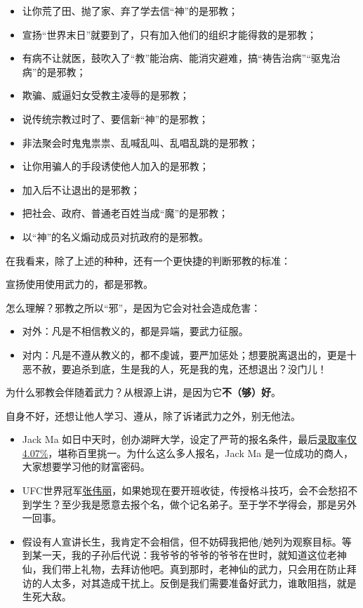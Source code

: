 \begin{itemize}[nosep, left=\parindent]
    \item 让你荒了田、抛了家、弃了学去信“神”的是邪教；
    \item 宣扬“世界末日”就要到了，只有加入他们的组织才能得救的是邪教；
    \item 有病不让就医，鼓吹入了“教”能治病、能消灾避难，搞“祷告治病”“驱鬼治病”的是邪教；
    \item 欺骗、威逼妇女受教主凌辱的是邪教；
    \item 说传统宗教过时了、要信新“神”的是邪教；
    \item 非法聚会时鬼鬼祟祟、乱喊乱叫、乱唱乱跳的是邪教；
    \item 让你用骗人的手段诱使他人加入的是邪教；
    \item 加入后不让退出的是邪教；
    \item 把社会、政府、普通老百姓当成“魔”的是邪教；
    \item 以“神”的名义煽动成员对抗政府的是邪教。
\end{itemize}

在我看来，除了上述的种种，还有一个更快捷的判断邪教的标准：

\begin{screen}
    宣扬使用使用武力的，都是邪教。
\end{screen}

怎么理解？邪教之所以“邪”，是因为它会对社会造成危害：

\begin{itemize}[nosep, left=\parindent]
    \item 对外：凡是不相信教义的，都是异端，要武力征服。
    \item 对内：凡是不遵从教义的，都不虔诚，要严加惩处；想要脱离退出的，更是十恶不赦，要追杀到底，生是我的人，死是我的鬼，还想退出？没门儿！
\end{itemize}

为什么邪教会伴随着武力？从根源上讲，是因为它\textbf{不（够）好}。

自身不好，还想让他人学习、遵从，除了诉诸武力之外，别无他法。

\begin{itemize}[nosep, left=\parindent]
    \item Jack Ma 如日中天时，创办湖畔大学，设定了严苛的报名条件，最后\href{https://zhuanlan.zhihu.com/p/265168680}{录取率仅4.07\%}，堪称百里挑一。为什么这么多人报名，Jack Ma 是一位成功的商人，大家想要学习他的财富密码。
    \item UFC世界冠军\href{https://baike.baidu.com/item/张伟丽/19688961}{张伟丽}，如果她现在要开班收徒，传授格斗技巧，会不会愁招不到学生？至少我是愿意去报个名，做个记名弟子。至于学不学得会，那是另外一回事。
    \item 假设有人宣讲长生，我肯定不会相信，但不妨碍我把他/她列为观察目标。等到某一天，我的子孙后代说：我爷爷的爷爷的爷爷在世时，就知道这位老神仙，我们带上礼物，去拜访他吧。真到那时，老神仙的武力，只会用在防止拜访的人太多，对其造成干扰上。反倒是我们需要准备好武力，谁敢阻挡，就是生死大敌。
\end{itemize}

